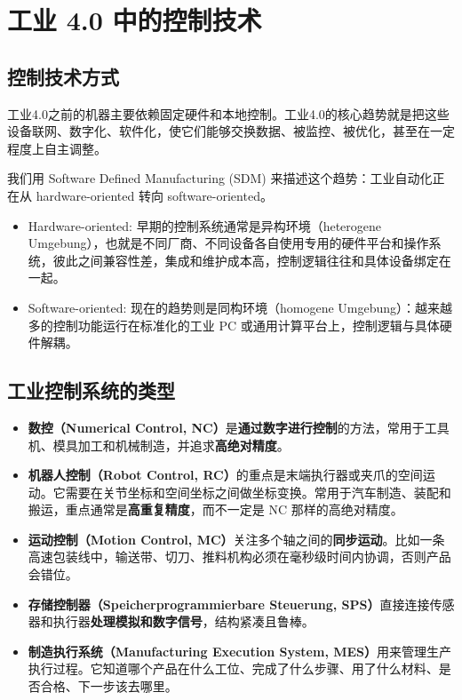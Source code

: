 \section{工业 4.0 中的控制技术}

\subsection{控制技术方式}

工业4.0之前的机器主要依赖固定硬件和本地控制。工业4.0的核心趋势就是把这些设备联网、数字化、软件化，使它们能够交换数据、被监控、被优化，甚至在一定程度上自主调整。

我们用 Software Defined Manufacturing (SDM) 来描述这个趋势：工业自动化正在从 hardware-oriented 转向 software-oriented。
\begin{itemize}
    \item Hardware-oriented: 早期的控制系统通常是异构环境（heterogene Umgebung），也就是不同厂商、不同设备各自使用专用的硬件平台和操作系统，彼此之间兼容性差，集成和维护成本高，控制逻辑往往和具体设备绑定在一起。
    \item Software-oriented: 现在的趋势则是同构环境（homogene Umgebung）：越来越多的控制功能运行在标准化的工业 PC 或通用计算平台上，控制逻辑与具体硬件解耦。
\end{itemize}


\subsection{工业控制系统的类型}
\label{subsec:controltype}

\begin{itemize}
    \item \textbf{数控（Numerical Control, NC）}是\textbf{通过数字进行控制}的方法，常用于工具机、模具加工和机械制造，并追求\textbf{高绝对精度}。
    \item \textbf{机器人控制（Robot Control, RC）}的重点是末端执行器或夹爪的空间运动。它需要在关节坐标和空间坐标之间做坐标变换。常用于汽车制造、装配和搬运，重点通常是\textbf{高重复精度}，而不一定是 NC 那样的高绝对精度。
    \item \textbf{运动控制（Motion Control, MC）}关注多个轴之间的\textbf{同步运动}。比如一条高速包装线中，输送带、切刀、推料机构必须在毫秒级时间内协调，否则产品会错位。
    \item \textbf{存储控制器（Speicherprogrammierbare Steuerung, SPS）}直接连接传感器和执行器\textbf{处理模拟和数字信号}，结构紧凑且鲁棒。
    \item \textbf{制造执行系统（Manufacturing Execution System, MES）}用来管理生产执行过程。它知道哪个产品在什么工位、完成了什么步骤、用了什么材料、是否合格、下一步该去哪里。
\end{itemize}



